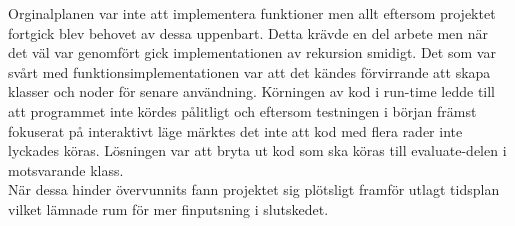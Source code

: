 \documentclass{Dokumentmall}
\begin{document}
Orginalplanen var inte att implementera funktioner men allt eftersom projektet fortgick blev behovet av dessa uppenbart. Detta krävde en del arbete men när det väl var genomfört gick implementationen av rekursion smidigt. Det som var svårt med funktionsimplementationen var att det kändes förvirrande att skapa klasser och noder för senare användning. Körningen av kod i run-time ledde till att programmet inte kördes pålitligt och eftersom testningen i början främst fokuserat på interaktivt läge märktes det inte att kod med flera rader inte lyckades köras. Lösningen var att bryta ut kod som ska köras till evaluate-delen i motsvarande klass.\\

När dessa hinder övervunnits fann projektet sig plötsligt framför utlagt tidsplan vilket lämnade rum för mer finputsning i slutskedet.
\end{document}
